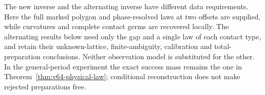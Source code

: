 The new inverse and the alternating inverse have different data
requirements.  Here the full marked polygon and phase-resolved laws at
two offsets are supplied, while curvatures and complete contact germs
are recovered locally.  The alternating results below need only the gap
and a single law of each contact type, and retain their unknown-lattice,
finite-ambiguity, calibration and total-preparation conclusions.  Neither
observation model is substituted for the other.  In the general-period
experiment the exact success mass remains the one in
Theorem~\ref{thm:v64-physical-law}; conditional reconstruction does not
make rejected preparations free.
